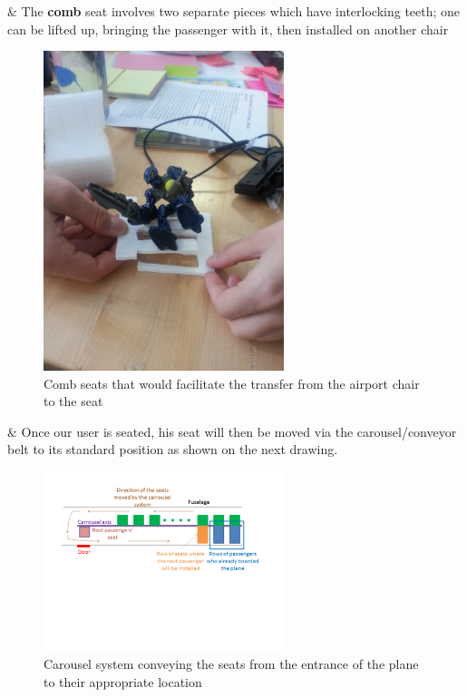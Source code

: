 \begin{easylist}[itemize]
\begin{easylist}[itemize]
	& The \textbf{comb} seat involves two separate pieces which have interlocking teeth; one can be lifted up, bringing the passenger with it, then installed on another chair
\begin{figure}[h]
  \centering
     \includegraphics[width=7cm]{images/20140120_121849.jpg}
   \caption{Comb seats that would facilitate the transfer from the airport chair to the seat}
  \label{fig:20140120_121849}
\end{figure} 

\end{easylist}

& Once our user is seated, his seat will then be moved via the carousel/conveyor belt to its standard position as shown on the next drawing.

\begin{figure}[h]
  \centering
     \includegraphics[width=7cm]{images/carousel_for_the_dummies.png}
   \caption{Carousel system conveying the seats from the entrance of the plane to their appropriate location}
  \label{fig:Carousel_system}
\end{figure} 
\end{easylist}

